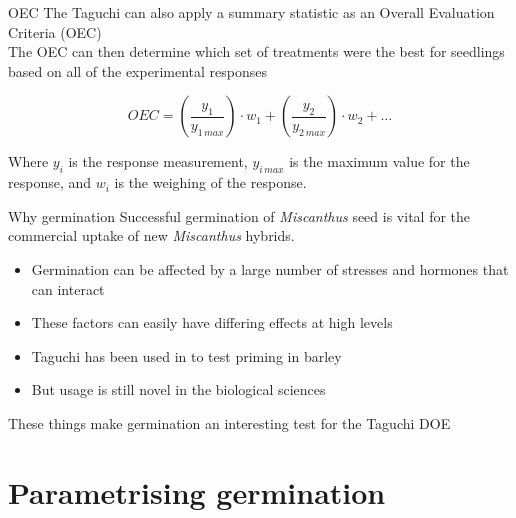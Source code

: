 \documentclass[10pt]{beamer}
\begin{document}
{%
\begin{frame}{OEC}
The Taguchi can also apply a summary statistic as an Overall Evaluation Criteria (OEC) \\ \vspace{4mm}
The OEC can then determine which set of treatments were the best for seedlings based on all of the experimental responses
\begin{exampleblock}{ }
\[
OEC =\left( \frac{y_1}{y_{1\,max}} \right) \cdot w_1 + \left( \frac{y_2}{y_{2\,max}} \right) \cdot w_2 + \dots
\]
\end{exampleblock}
Where $y_i$ is the response measurement, $y_{i\,max}$ is the maximum value for the response, and $w_i$ is the weighing of the response.
\end{frame}
}


{%
\begin{frame}[fragile]{Why germination}
Successful germination of \textit{\textit{Miscanthus}} seed is vital for the commercial uptake of new \textit{Miscanthus} hybrids.
	\begin{itemize}
		\item Germination can be affected by a large number of stresses and hormones that can interact
		\item These factors can easily have differing effects at high levels
		\item Taguchi has been used in to test priming in barley
		\item But usage is still novel in the biological sciences
	\end{itemize}
These things make germination an interesting test for the Taguchi DOE
\end{frame}
}



\section{Parametrising germination}
\end{document}

